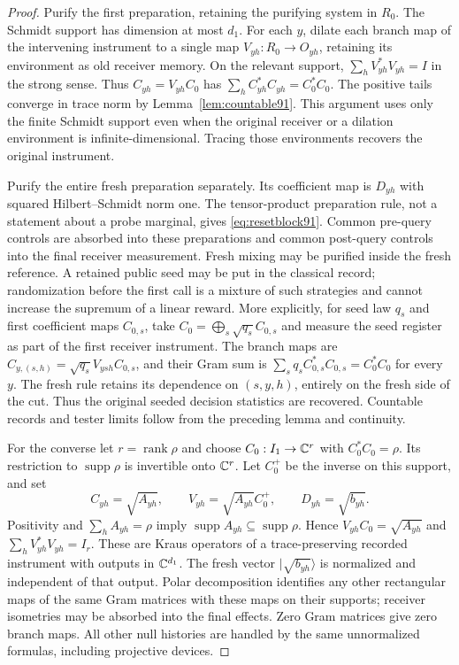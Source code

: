\begin{proof}
Purify the first preparation, retaining the purifying system in $R_0$.
The Schmidt support has dimension at most $d_1$.  For each $y$, dilate
each branch map of the intervening instrument to a single map
$V_{yh}:R_0\to O_{yh}$, retaining its environment as old receiver
memory.  On the relevant support,
$\sum_hV_{yh}^*V_{yh}=I$ in the strong sense.  Thus
$C_{yh}=V_{yh}C_0$ has
$\sum_h C_{yh}^*C_{yh}=C_0^*C_0$.
The positive tails converge in trace norm by Lemma~\ref{lem:countable91}.
This argument uses only the finite Schmidt support even when the
original receiver or a dilation environment is infinite-dimensional.
Tracing those environments recovers the original instrument.

Purify the entire fresh preparation separately.  Its coefficient map
is $D_{yh}$ with squared Hilbert--Schmidt norm one.  The tensor-product
preparation rule, not a statement about a probe marginal, gives
\eqref{eq:resetblock91}.  Common pre-query controls are absorbed into
these preparations and common post-query controls into the final
receiver measurement.  Fresh mixing may be purified inside the fresh
reference.  A retained public seed may be put in the classical record;
randomization before the first call is a mixture of such strategies and
cannot increase the supremum of a linear reward.  More explicitly,
for seed law $q_s$ and first coefficient maps $C_{0,s}$, take
$C_0=\bigoplus_s\sqrt{q_s}C_{0,s}$ and measure the seed register
as part of the first receiver instrument.  The branch maps are
$C_{y,(s,h)}=\sqrt{q_s}V_{ysh}C_{0,s}$, and their Gram sum is
$\sum_sq_sC_{0,s}^*C_{0,s}=C_0^*C_0$ for every $y$.
The fresh rule retains its dependence on $(s,y,h)$, entirely on the
fresh side of the cut.  Thus the original seeded decision statistics
are recovered.  Countable records and tester limits follow from the
preceding lemma and continuity.

For the converse let $r=\operatorname{rank}\rho$ and choose
$C_0:I_1\to\mathbb C^r$ with $C_0^*C_0=\rho$.  Its restriction to
$\operatorname{supp}\rho$ is invertible onto $\mathbb C^r$.  Let $C_0^+$
be the inverse on this support, and set
\[
 C_{yh}=\sqrt{A_{yh}},\qquad
 V_{yh}=\sqrt{A_{yh}}C_0^+,\qquad D_{yh}=\sqrt{b_{yh}}.
\]
Positivity and $\sum_hA_{yh}=\rho$ imply
$\operatorname{supp}A_{yh}\subseteq\operatorname{supp}\rho$.
Hence $V_{yh}C_0=\sqrt{A_{yh}}$ and
$\sum_hV_{yh}^*V_{yh}=I_r$.  These are Kraus operators of a
trace-preserving recorded instrument with outputs in $\mathbb C^{d_1}$.
The fresh vector $|\sqrt{b_{yh}}\rangle$ is normalized and independent
of that output.  Polar decomposition identifies any other rectangular
maps of the same Gram matrices with these maps on their supports;
receiver isometries may be absorbed into the final effects.
Zero Gram matrices give zero branch maps.  All other null histories are
handled by the same unnormalized formulas, including projective devices.
\end{proof}

